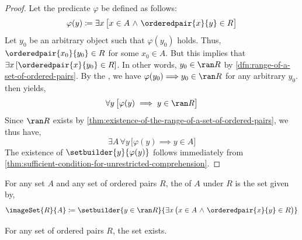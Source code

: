 \begin{proof}
    Let the predicate \( \varphi \) be defined as follows:
    \begin{equation*}
        \varphi(y) \coloneq \exists x \, \big[ x \in A \,\,{\land}\,\, \orderedpair{x}{y} \in R \big]
    \end{equation*}
    Let \( y_{0} \) be an arbitrary object such that \( \varphi(y_{0}) \) holds. Thus, \( \orderedpair{x_{0}}{y_{0}} \in R \) for some \( x_{0} \in A \).
    But this implies that \( \exists x \, \mleft[ \orderedpair{x}{y_{0}} \in R \mright] \).
    In other words, \( y_{0} \in \ran R \) by \cref{dfn:range-of-a-set-of-ordered-pairs}.
    By the , we have \( \varphi(y_{0}) {\implies} y_{0} \in \ran R \) for any arbitrary \( y_{0} \).
     then yields,
    \begin{equation*}
        \forall y \, \big[ \varphi(y) \implies y \in \ran R \big]
    \end{equation*}
    Since \( \ran R \) exists by \cref{thm:existence-of-the-range-of-a-set-of-ordered-pairs}, we thus have,
    \begin{equation*}
        \exists A \, \forall y \, \big[ \varphi(y) \implies y \in A \big]
    \end{equation*}
    The existence of \( \setbuilder{y}{\varphi(y)} \) follows immediately from \cref{thm:sufficient-condition-for-unrestricted-comprehension}.
\end{proof}

\begin{dfn}[Image]
    \label{dfn:image-of-a-set-of-ordered-pairs}
    For any set \( A \) and any set of ordered pairs \( R \), the  of \( A \) under \( R \)
    is the set given by,
    \begin{equation*}
        \imageSet{R}{A} \coloneq \setbuilder{y \in \ran R}{\exists x \, \big( x \in A \,\,{\land}\,\, \orderedpair{x}{y} \in R \big)}
    \end{equation*}
\end{dfn}

\begin{thm}
    \label{thm:existence-of-the-inverse-of-a-set-of-ordered-pairs}
    For any set of ordered pairs \( R \), the set  exists.
\end{thm}

